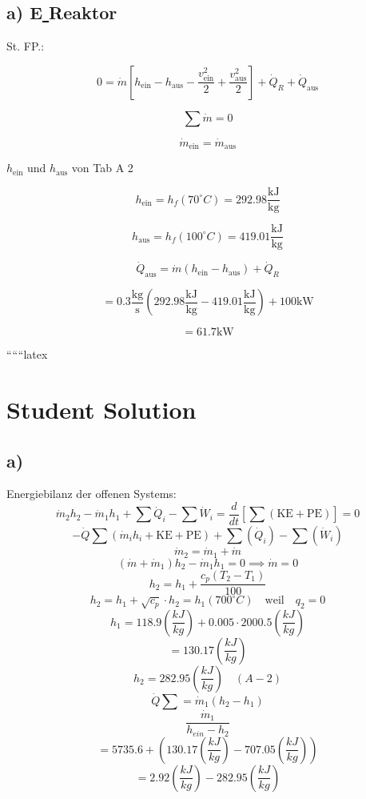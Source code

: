 \subsection*{a) E\underline{ } Reaktor}

St. FP.:

\[
0 = \dot{m} \left[ h_{\text{ein}} - h_{\text{aus}} - \frac{v^2_{\text{ein}}}{2} + \frac{v^2_{\text{aus}}}{2} \right] + \dot{Q}_R + \dot{Q}_{\text{aus}}
\]

\[
\sum \dot{m} = 0
\]

\[
\dot{m}_{\text{ein}} = \dot{m}_{\text{aus}}
\]

\noindent
$h_{\text{ein}}$ und $h_{\text{aus}}$ von Tab A 2

\[
h_{\text{ein}} = h_f(70^\circ C) = 292.98 \frac{\text{kJ}}{\text{kg}}
\]

\[
h_{\text{aus}} = h_f(100^\circ C) = 419.01 \frac{\text{kJ}}{\text{kg}}
\]

\[
\dot{Q}_{\text{aus}} = \dot{m} \left( h_{\text{ein}} - h_{\text{aus}} \right) + \dot{Q}_R
\]

\[
= 0.3 \frac{\text{kg}}{\text{s}} \left( 292.98 \frac{\text{kJ}}{\text{kg}} - 419.01 \frac{\text{kJ}}{\text{kg}} \right) + 100 \text{kW}
\]

\[
= 61.7 \text{kW}
\]

``````latex

\section*{Student Solution}



\subsection*{a)}
Energiebilanz der offenen Systems:
\[
\dot{m}_2 h_2 - \dot{m}_1 h_1 + \sum \dot{Q}_i - \sum \dot{W}_i = \frac{d}{dt} \left[ \sum \left( \text{KE} + \text{PE} \right) \right] = 0
\]
\[
- \dot{Q} \sum \left( \dot{m}_i h_i + \text{KE} + \text{PE} \right) + \sum \left( \dot{Q}_i \right) - \sum \left( \dot{W}_i \right)
\]
\[
\dot{m}_2 = \dot{m}_1 + \dot{m}
\]
\[
(\dot{m} + \dot{m}_1) h_2 - \dot{m}_1 h_1 = 0 \implies \dot{m} = 0
\]
\[
h_2 = h_1 + \frac{c_p (T_2 - T_1)}{100}
\]
\[
h_2 = h_1 + \sqrt{c_p} \cdot h_2 = h_1 (700^\circ C) \quad \text{weil} \quad q_2 = 0
\]
\[
h_1 = 118.9 \left( \frac{kJ}{kg} \right) + 0.005 \cdot 2000.5 \left( \frac{kJ}{kg} \right)
\]
\[
= 130.17 \left( \frac{kJ}{kg} \right)
\]
\[
h_2 = 282.95 \left( \frac{kJ}{kg} \right) \quad (A-2)
\]
\[
\dot{Q} \sum = \dot{m}_1 (h_2 - h_1)
\]
\[
\frac{\dot{m}_1}{h_{ein} - h_2}
\]
\[
= 5735.6 + (130.17 \left( \frac{kJ}{kg} \right) - 707.05 \left( \frac{kJ}{kg} \right))
\]
\[
= 2.92 \left( \frac{kJ}{kg} \right) - 282.95 \left( \frac{kJ}{kg} \right)
\]